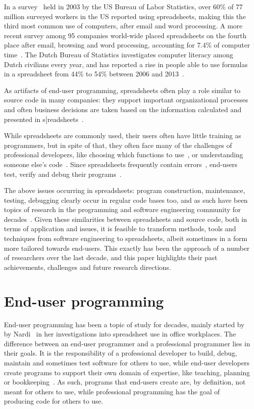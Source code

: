 \documentclass[conference]{IEEEtran}
\begin{document}
In a survey~\cite{BLS2003} held in 2003 by the US Bureau of Labor Statistics, over 60\% of 77 million surveyed workers in the US reported using spreadsheets, making this the third most common use of computers, after email and word processing. A more recent survey among 95 companies world-wide placed spreadsheets on the fourth place after email, browsing and word processing, accounting for 7.4\% of computer time~\cite{Wellnomics2007}. The Dutch Bureau of Statistics investigates computer literacy among Dutch civilians every year, and has reported a rise in people able to use formulas in a spreadsheet from 44\% to 54\% between 2006 and 2013~\cite{CBS2013}.

As artifacts of end-user programming, spreadsheets often play a role similar to source code in many companies: they support important organizational processes and often business decisions are taken based on the information calculated and presented in s[readsheets~\cite{hermans_supporting_2011}.

While spreadsheets are commonly used, their users often have little training as programmers, but in spite of that, they often face many of the challenges of professional developers, like choosing which functions to use~\cite{Ko2004}, or understanding someone else's code~\cite{Ko2011}. Since spreadsheets frequently contain errors~\cite{Panko1998}, end-users test, verify and debug their programs~\cite{Hermans2013-Cascon,Ko2004-Why}.

The above issues occurring in spreadsheets: program construction, maintenance, testing, debugging clearly occur in regular code bases too, and as such have been topics of research in the programming and software engineering community for decades~\cite{Ko2011}. Given these similarities between spreadsheets and source code, both in terms of application and issues, it is feasible to transform methods, tools and techniques from software engineering to spreadsheets, albeit sometimes in a form more tailored towards end-users. This exactly has been the approach of a number of researchers over the last decade, and this paper highlights their past achievements, challenges and future research directions. 


\section{End-user programming}
End-user programming has been a topic of study for decades, mainly started by by Nardi~\cite{Nardi1993} in her investigations into spreadsheet use in office workplaces. The difference between an end-user programmer and a professional programmer lies in their goals. It is the responsibility of a professional developer to build, debug, maintain and sometimes test software for others to use, while end-user developers create programs to support their own domain of expertise, like teaching, planning or bookkeeping~\cite{Ko2011}. As such, programs that end-users create are, by definition, not meant for others to use, while professional programming has the goal of producing code for others to use. 
\end{document}
